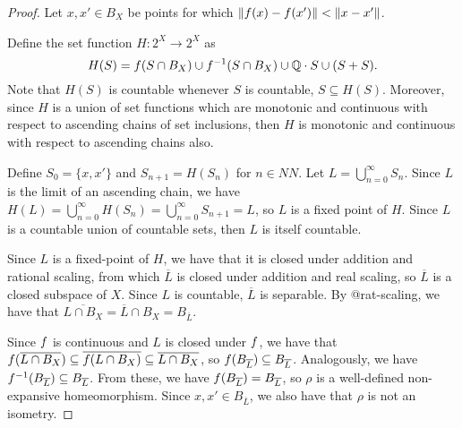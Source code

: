 \documentclass{amsart}
\newcommand{\clo}[1]{\overline{#1}}
\begin{document}
\begin{proof}
    Let $x, x' \in B_X$ be points for which $\norm{f(x)-f(x')} < \norm{x-x'}$.

    Define the set function $H : 2^X \to 2^X$ as \[ H(S) = f(S \cap B_X) \cup f^{-1}(S \cap B_X) \cup \mathbb{Q} \cdot S \cup (S+S). \] Note that $H(S)$ is countable whenever $S$ is countable, $S \subseteq H(S)$. Moreover, since $H$ is a union of set functions which are monotonic and continuous with respect to ascending chains of set inclusions, then $H$ is monotonic and continuous with respect to ascending chains also.
  
    Define $S_0 = \{x,x'\}$ and $S_{n+1} = H(S_n)$ for $n \in NN$. Let $L = \bigcup_{n=0}^\infty S_n.$ Since $L$ is the limit of an ascending chain, we have $H(L) = \bigcup_{n=0}^\infty H(S_n) = \bigcup_{n=0}^\infty S_{n+1} = L$, so $L$ is a fixed point of $H$. Since $L$ is a countable union of countable sets, then $L$ is itself countable.
  
    Since $L$ is a fixed-point of $H$, we have that it is closed under addition and rational scaling, from which $\clo{L}$ is closed under addition and real scaling, so $\clo{L}$ is a closed subspace of $X$.
    Since $L$ is countable, $\clo{L}$ is separable. By @rat-scaling,
    we have that $\clo{L \cap B_X} = \clo{L} \cap B_X = B_{\clo{L}}$.
  
    Since $f$ is continuous and $L$ is closed under $f$, we have
    that $\lip(\clo{L \cap B_X}) \subseteq \clo{\lip(L \cap B_X)} \subseteq \clo{L \cap B_X}$, so $\lip(B_{\clo{L}}) \subseteq B_{\clo{L}}$. Analogously, we have $\lip^{-1}(B_{\clo{L}}) \subseteq B_{\clo{L}}$. From these, we have $\lip(B_{\clo{L}}) = B_{\clo{L}}$, so $\rho$ is a well-defined non-expansive homeomorphism. Since $x, x' \in B_{\clo{L}}$, we also have that $\rho$ is not an isometry.
\end{proof}

\printbibliography
\end{document}
